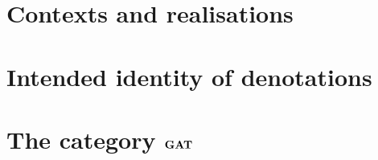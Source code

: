 \lipsum[10]

\section{Contexts and realisations} \label{sec:source-1-12}

\lipsum[11]

\section{Intended identity of denotations} \label{sec:source-1-13}

\lipsum[12]

\section{The category $\mathbf{GAT}$} \label{sec:source-1-14}

\lipsum[13]

